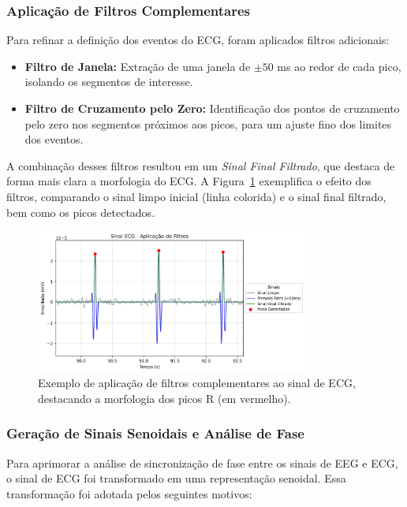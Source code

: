 \subsubsection{Aplicação de Filtros Complementares}

Para refinar a definição dos eventos do ECG, foram aplicados filtros adicionais:
\begin{itemize}
    \item \textbf{Filtro de Janela:} Extração de uma janela de \(\pm50\) ms ao redor de cada pico, isolando os segmentos de interesse.
    \item \textbf{Filtro de Cruzamento pelo Zero:} Identificação dos pontos de cruzamento pelo zero nos segmentos próximos aos picos, para um ajuste fino dos limites dos eventos.
\end{itemize}
A combinação desses filtros resultou em um \emph{Sinal Final Filtrado}, que destaca de forma mais clara a morfologia do ECG. A Figura~\ref{fig:ecg_filtros_aplicados} exemplifica o efeito dos filtros, comparando o sinal limpo inicial (linha colorida) e o sinal final filtrado, bem como os picos detectados.

\begin{figure}[htb]
    \centering
    \includegraphics[width=0.8\textwidth]{figs/2_preprocessamento_ecg/2_Sinal_ECG_-_Aplicação_de_Filtros_zoom.png}
    \caption{Exemplo de aplicação de filtros complementares ao sinal de ECG, destacando a morfologia dos picos R (em vermelho).}
    \label{fig:ecg_filtros_aplicados}
\end{figure}

\subsubsection{Geração de Sinais Senoidais e Análise de Fase}

Para aprimorar a análise de sincronização de fase entre os sinais de EEG e ECG, o sinal de ECG foi transformado em uma representação senoidal. Essa transformação foi adotada pelos seguintes motivos:

